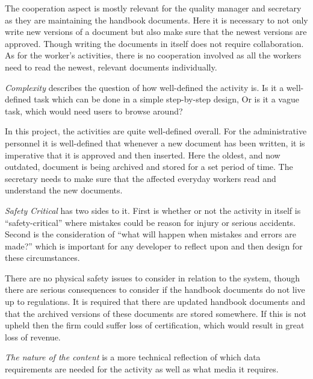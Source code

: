 The cooperation aspect is mostly relevant for the quality manager and secretary as they are maintaining the handbook documents.
Here it is necessary to not only write new versions of a document but also make sure that the newest versions are approved.
Though writing the documents in itself does not require collaboration.
As for the worker's activities, there is no cooperation involved as all the workers need to read the newest, relevant documents individually.


\textit{Complexity} describes the question of how well-defined the activity is.
Is it a well-defined task which can be done in a simple step-by-step design,
Or is it a vague task, which would need users to browse around? \citep{Benyon}

In this project, the activities are quite well-defined overall.
For the administrative personnel it is well-defined that whenever a new document has been written, it is imperative that it is approved and then inserted.
Here the oldest, and now outdated, document is being archived and stored for a set period of time.
The secretary needs to make sure that the affected everyday workers read and understand the new documents.


\textit{Safety Critical} has two sides to it.
First is whether or not the activity in itself is ``safety-critical'' where mistakes could be reason for injury or serious accidents.
Second is the consideration of ``what will happen when mistakes and errors are made?'' which is important for any developer to reflect upon and then design for these circumstances.
\citep{Benyon}

There are no physical safety issues to consider in relation to the system, though there are serious consequences to consider if the handbook documents do not live up to regulations.
It is required that there are updated handbook documents and that the archived versions of these documents are stored somewhere.
If this is not upheld then the firm could suffer loss of certification, which would result in great loss of revenue.

\textit{The nature of the content} is a more technical reflection of which data requirements are needed for the activity as well as what media it requires.
\citep{Benyon}

